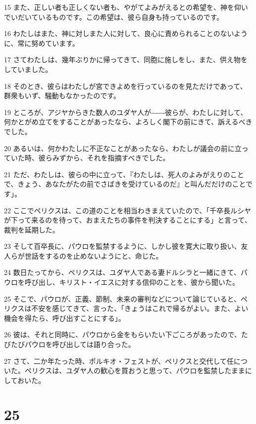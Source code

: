 \par 15 また、正しい者も正しくない者も、やがてよみがえるとの希望を、神を仰いでいだいているものです。この希望は、彼ら自身も持っているのです。
\par 16 わたしはまた、神に対しまた人に対して、良心に責められることのないように、常に努めています。
\par 17 さてわたしは、幾年ぶりかに帰ってきて、同胞に施しをし、また、供え物をしていました。
\par 18 そのとき、彼らはわたしが宮できよめを行っているのを見ただけであって、群衆もいず、騒動もなかったのです。
\par 19 ところが、アジヤからきた数人のユダヤ人が――彼らが、わたしに対して、何かとがめ立てをすることがあったなら、よろしく閣下の前にきて、訴えるべきでした。
\par 20 あるいは、何かわたしに不正なことがあったなら、わたしが議会の前に立っていた時、彼らみずから、それを指摘すべきでした。
\par 21 ただ、わたしは、彼らの中に立って、『わたしは、死人のよみがえりのことで、きょう、あなたがたの前でさばきを受けているのだ』と叫んだだけのことです」。
\par 22 ここでペリクスは、この道のことを相当わきまえていたので、「千卒長ルシヤが下って来るのを待って、おまえたちの事件を判決することにする」と言って、裁判を延期した。
\par 23 そして百卒長に、パウロを監禁するように、しかし彼を寛大に取り扱い、友人らが世話をするのを止めないようにと、命じた。
\par 24 数日たってから、ペリクスは、ユダヤ人である妻ドルシラと一緒にきて、パウロを呼び出し、キリスト・イエスに対する信仰のことを、彼から聞いた。
\par 25 そこで、パウロが、正義、節制、未来の審判などについて論じていると、ペリクスは不安を感じてきて、言った、「きょうはこれで帰るがよい。また、よい機会を得たら、呼び出すことにする」。
\par 26 彼は、それと同時に、パウロから金をもらいたい下ごころがあったので、たびたびパウロを呼び出しては語り合った。
\par 27 さて、二か年たった時、ポルキオ・フェストが、ペリクスと交代して任についた。ペリクスは、ユダヤ人の歓心を買おうと思って、パウロを監禁したままにしておいた。

\chapter{25}


